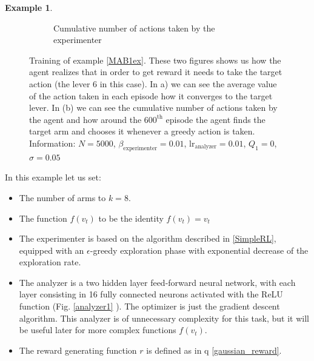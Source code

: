 \documentclass[11pt,a4paper,twoside]{report}
\newcommand{\+}{\textnormal{+} }
\theoremstyle{definition}
\newtheorem{myex}[mythm]{Example}
\numberwithin{equation}{chapter}
\begin{document}
\begin{myex}
\begin{figure}[]
\begin{subfigure}{.5\textwidth}
        \caption{Cumulative number of actions taken by the experimenter}
        \label{fig:actionsMAB1}
      \end{subfigure}
      \caption{Training of example \ref{MAB1ex}. These two figures shows us how
      the agent realizes that in order to get reward it needs to take the target
      action (the lever 6 in this case). In a) we can see the average value of
      the action taken in each episode how it converges to the target lever.
      In (b) we can see the cumulative number of actions taken by the agent and
      how around the $600^\text{th}$ episode the agent finds the target arm and
      chooses it whenever a greedy action is taken. Information: $N=5000$,
      $\beta_\text{experimenter}=0.01$, $\text{lr}_\text{analyzer}=0.01$,
      $Q_1=0$, $\sigma=0.05$}
    \end{figure}  



    In this example let us set:

    \begin{itemize}
      \item The number of arms to $k=8$.
      \item The function $f(v_t)$ to be the identity $f(v_t)=v_t$
      \item The experimenter is based on the algorithm described in
      \ref{SimpleRL}, equipped with an $\epsilon$-greedy exploration phase with
      exponential decrease of the exploration rate. 
      \item The analyzer is a two hidden layer feed-forward neural network, with
      each layer consisting in 16 fully connected neurons activated with the
      ReLU function (Fig. \ref{analyzer1} ). The optimizer is just the
      gradient descent algorithm. This analyzer is of unnecessary complexity for
      this task, but it will be useful later for more complex functions
      $f(v_t)$.
      \item The reward generating function $r$ is defined as in q
      \eqref{gaussian_reward}.
    \end{itemize}


\end{myex}
\end{document}

